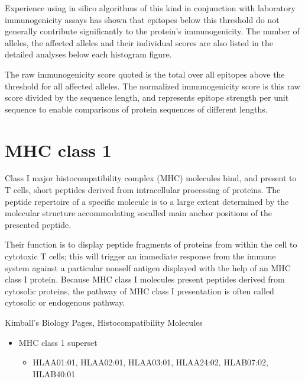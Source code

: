 \documentclass[letterpaper,10pt,english]{jupyterBook}
\begin{document}
\sphinxAtStartPar
Experience using in silico algorithms of this kind in conjunction with laboratory immunogenicity assays has shown that epitopes below this threshold do not generally contribute significantly to the protein’s immunogenicity. The number of alleles, the affected alleles and their individual scores are also listed in the detailed analyses below each histogram figure.

\sphinxAtStartPar
The raw immunogenicity score quoted is the total over all epitopes above the threshold for all affected alleles. The normalized immunogenicity score is this raw score divided by the sequence length, and represents epitope strength per unit sequence to enable comparisons of protein sequences of different lengths.


\section{MHC class 1}
\label{\detokenize{ipynb/chapter2:mhc-class-1}}
\sphinxAtStartPar
Class I major histocompatibility complex (MHC) molecules bind, and present to T cells, short peptides derived from intracellular processing of proteins. The peptide repertoire of a specific molecule is to a large extent determined by the molecular structure accommodating so\sphinxhyphen{}called main anchor positions of the presented peptide.

\sphinxAtStartPar
Their function is to display peptide fragments of proteins from within the cell to cytotoxic T cells; this will trigger an immediate response from the immune system against a particular non\sphinxhyphen{}self antigen displayed with the help of an MHC class I protein. Because MHC class I molecules present peptides derived from cytosolic proteins, the pathway of MHC class I presentation is often called cytosolic or endogenous pathway.%
\begin{footnote}[1]\sphinxAtStartFootnote
Kimball’s Biology Pages, Histocompatibility Molecules
%
\end{footnote}
\begin{itemize}
\item {} 
\sphinxAtStartPar
MHC class 1 superset
\begin{itemize}
\item {} 
\sphinxAtStartPar
HLA\sphinxhyphen{}A01:01, HLA\sphinxhyphen{}A02:01, HLA\sphinxhyphen{}A03:01, HLA\sphinxhyphen{}A24:02, HLA\sphinxhyphen{}B07:02, HLA\sphinxhyphen{}B40:01

\end{itemize}

\end{itemize}
\end{document}
